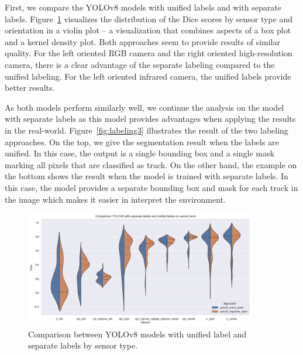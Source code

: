 \documentclass[Master,MDS,english]{BASE/twbook} %
\begin{document}
First, we compare the YOLOv8 models with unified labels and with separate labels. Figure~\ref{fig:yolo_vs_yolo} visualizes the distribution of the Dice scores by sensor type and orientation in a violin plot -- a visualization that combines aspects of a box plot and a kernel density plot. 
Both approaches seem to provide results of similar quality. 
For the left oriented RGB camera and the right oriented high-resolution camera, there is a clear advantage of the separate labeling compared to the unified labeling. For the left oriented infrared camera, the unified labels provide better results.

As both models perform similarly well, we continue the analysis on the model with separate labels as this model provides advantages when applying the results in the real-world. 
Figure~\ref{fig:labeling3} illustrates the result of the two labeling approaches. 
On the top, we give the segmentation result when the labels are unified. In this case, the output is a single bounding box and a single mask marking all pixels that are classified as track. On the other hand, the example on the bottom shows the result when the model is trained with separate labels. In this case, the model provides a separate bounding box and mask for each track in the image which makes it easier in interpret the environment.

 

\begin{figure}[h]
\centering
\includegraphics[width=0.9\textwidth]{images/results/violin_plot_yolo}
\caption{Comparison between YOLOv8 models with unified label and separate labels by sensor type. }
\label{fig:yolo_vs_yolo}
\end{figure}
\end{document}
